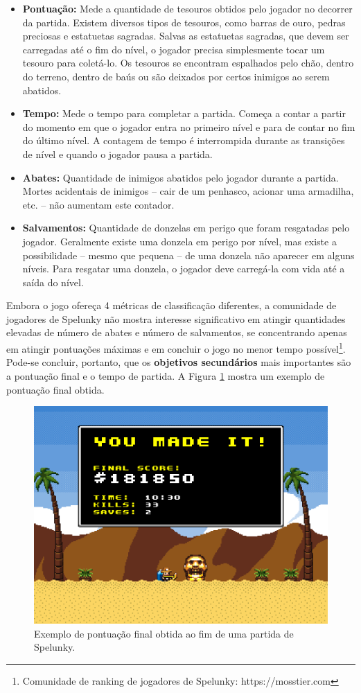 \begin{itemize}
	\item \textbf{Pontuação:} Mede a quantidade de tesouros obtidos pelo jogador
	no decorrer da partida. Existem diversos tipos de tesouros, como barras de
	ouro, pedras preciosas e estatuetas sagradas. Salvas as estatuetas sagradas,
	que devem ser carregadas até o fim do nível, o jogador precisa simplesmente
	tocar um tesouro para coletá-lo. Os tesouros se encontram espalhados pelo
	chão, dentro do terreno, dentro de baús ou são deixados por certos inimigos
	ao serem abatidos.

	\item \textbf{Tempo:} Mede o tempo para completar a partida. Começa a contar
	a partir do momento em que o jogador entra no primeiro nível e para de
	contar no fim do último nível. A contagem de tempo é interrompida durante as
	transições de nível e quando o jogador pausa a partida.

	\item \textbf{Abates:} Quantidade de inimigos abatidos pelo jogador durante
	a partida. Mortes acidentais de inimigos -- cair de um penhasco, acionar uma
	armadilha, etc. -- não aumentam este contador.

	\item \textbf{Salvamentos:} Quantidade de donzelas em perigo que foram
	resgatadas pelo jogador. Geralmente existe uma donzela em perigo por nível,
	mas existe a possibilidade -- mesmo que pequena -- de uma donzela não
	aparecer em alguns níveis. Para resgatar uma donzela, o jogador deve
	carregá-la com vida até a saída do nível.
\end{itemize}

Embora o jogo ofereça 4 métricas de classificação diferentes, a comunidade de
jogadores de Spelunky não mostra interesse significativo em atingir quantidades
elevadas de número de abates e número de salvamentos, se concentrando apenas em
atingir pontuações máximas e em concluir o jogo no menor tempo
possível\footnote{Comunidade de ranking de jogadores de Spelunky:
https://mosstier.com}. Pode-se concluir, portanto, que os \textbf{objetivos
secundários} mais importantes são a pontuação final e o tempo de partida. A
Figura \ref{fig:spelunky-scores} mostra um exemplo de pontuação final obtida.

\begin{figure}[htb!]
\centering
\includegraphics[width=.65\textwidth]{fig/spelunky-score.png}
\caption{\label{fig:spelunky-scores}Exemplo de pontuação final obtida ao fim de
uma partida de Spelunky.}
\end{figure}


